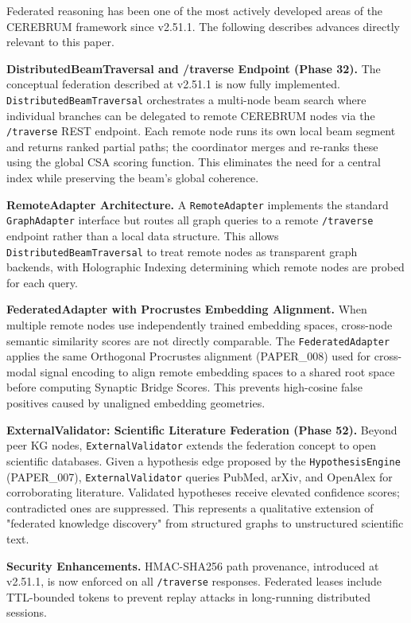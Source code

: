 Federated reasoning has been one of the most actively developed areas of the CEREBRUM framework since v2.51.1. The following describes advances directly relevant to this paper.

\textbf{DistributedBeamTraversal and /traverse Endpoint (Phase 32).} The conceptual federation described at v2.51.1 is now fully implemented. \texttt{DistributedBeamTraversal} orchestrates a multi-node beam search where individual branches can be delegated to remote CEREBRUM nodes via the \texttt{/traverse} REST endpoint. Each remote node runs its own local beam segment and returns ranked partial paths; the coordinator merges and re-ranks these using the global CSA scoring function. This eliminates the need for a central index while preserving the beam's global coherence.

\textbf{RemoteAdapter Architecture.} A \texttt{RemoteAdapter} implements the standard \texttt{GraphAdapter} interface but routes all graph queries to a remote \texttt{/traverse} endpoint rather than a local data structure. This allows \texttt{DistributedBeamTraversal} to treat remote nodes as transparent graph backends, with Holographic Indexing determining which remote nodes are probed for each query.

\textbf{FederatedAdapter with Procrustes Embedding Alignment.} When multiple remote nodes use independently trained embedding spaces, cross-node semantic similarity scores are not directly comparable. The \texttt{FederatedAdapter} applies the same Orthogonal Procrustes alignment (PAPER_008) used for cross-modal signal encoding to align remote embedding spaces to a shared root space before computing Synaptic Bridge Scores. This prevents high-cosine false positives caused by unaligned embedding geometries.

\textbf{ExternalValidator: Scientific Literature Federation (Phase 52).} Beyond peer KG nodes, \texttt{ExternalValidator} extends the federation concept to open scientific databases. Given a hypothesis edge proposed by the \texttt{HypothesisEngine} (PAPER_007), \texttt{ExternalValidator} queries PubMed, arXiv, and OpenAlex for corroborating literature. Validated hypotheses receive elevated confidence scores; contradicted ones are suppressed. This represents a qualitative extension of "federated knowledge discovery" from structured graphs to unstructured scientific text.

\textbf{Security Enhancements.} HMAC-SHA256 path provenance, introduced at v2.51.1, is now enforced on all \texttt{/traverse} responses. Federated leases include TTL-bounded tokens to prevent replay attacks in long-running distributed sessions.